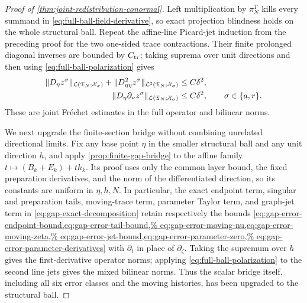 \begin{proof}[Proof of \cref{thm:joint-redistribution-conormal}]
Left multiplication by \(\pi_N^T\) kills every summand in
\cref{eq:full-ball-field-derivative}, so exact projection blindness holds on
the whole structural ball.  Repeat the affine-line Picard-jet induction from
the preceding proof for the two one-sided trace contractions.  Their finite
prolonged diagonal inverses are bounded by \(C_{\rm tr}\); taking suprema over
unit directions and then using \cref{eq:full-ball-polarization} gives
\begin{align}
 \|D_\eta z^\sigma\|_{\mathcal L(\mathfrak T_N;\mathcal X_\sigma)}
 +\|D_{\eta\eta}^2z^\sigma\|_{\mathcal L^2(\mathfrak T_N;\mathcal X_\sigma)}
 &\le C\delta^2,\notag\\
 \|D_\eta\partial_\nu z^\sigma\|_{\mathcal L(\mathfrak T_N;\mathcal X_\sigma)}
 &\le C\delta^2,\qquad \sigma\in\{a,r\}.            \label{eq:full-ball-trace-jets}
\end{align}
These are joint Fr\'{e}chet estimates in the full operator and bilinear norms.

We next upgrade the finite-section bridge without combining unrelated
directional limits.  Fix any base point \(\eta\) in the smaller structural
ball and any unit direction \(h\), and apply
\cref{prop:finite-gap-bridge} to the affine family
\(t\mapsto(B_k+E_k)+t h_k\).  Its proof uses only the common layer bound, the
fixed preparation derivatives, and the norm of the differentiated direction,
so its constants are uniform in \(\eta,h,N\).  In particular, the exact
endpoint term, singular and preparation tails, moving-trace term, parameter
Taylor term, and graph-jet term in
\cref{eq:gap-exact-decomposition} retain respectively the bounds
\cref{eq:gap-error-endpoint-bound,eq:gap-error-tail-bound,%
eq:gap-error-moving-nu,eq:gap-error-moving-zeta,%
eq:gap-error-jet-bound,eq:gap-error-parameter-zero,%
eq:gap-error-parameter-derivatives} with \(\partial_t\) in place of
\(\partial_\zeta\).  Taking the supremum over \(h\) gives the
first-derivative operator norms; applying
\cref{eq:full-ball-polarization} to the second line jets gives the mixed
bilinear norms.  Thus the scalar bridge itself, including all six error
classes and the moving histories, has been upgraded to the structural ball.


\end{proof}
